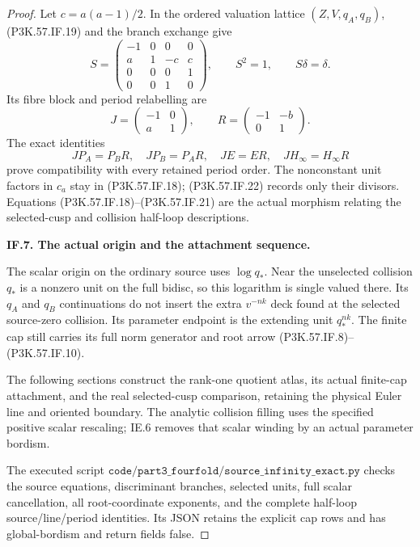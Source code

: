 \begin{proof}
Let \(c=a(a-1)/2\). In the ordered valuation lattice
\((Z,V,q_A,q_B)\), (P3K.57.IF.19) and the branch exchange give
\[
 S=\begin{pmatrix}
 -1&0&0&0\\ a&1&-c&c\\0&0&0&1\\0&0&1&0
 \end{pmatrix},\qquad S^2=1,\qquad S\delta=\delta.       \tag{P3K.57.IF.22}
\]
Its fibre block and period relabelling are
\[
 J=\begin{pmatrix}-1&0\\a&1\end{pmatrix},\qquad
 R=\begin{pmatrix}-1&-b\\0&1\end{pmatrix}.
\]
The exact identities
\[
 JP_A=P_BR,\quad JP_B=P_AR,\quad JE=ER,\quad
 JH_\infty=H_\infty R                                  \tag{P3K.57.IF.23}
\]
prove compatibility with every retained period order. The nonconstant
unit factors in \(c_a\) stay in (P3K.57.IF.18); (P3K.57.IF.22) records only their divisors.
Equations (P3K.57.IF.18)--\allowbreak (P3K.57.IF.21) are the actual morphism relating the
selected-cusp and collision half-loop descriptions.

\par\medskip\noindent\textbf{IF.7. The actual origin and the attachment sequence.}\par\nopagebreak[4]

The scalar origin on the ordinary source uses \(\log q_*\). Near the
unselected collision \(q_*\) is a nonzero unit on the full bidisc, so this
logarithm is single valued there. Its \(q_A\) and \(q_B\) continuations do
not insert the extra \(v^{-nk}\) deck found at the selected source-zero
collision. Its parameter endpoint is the extending unit \(q_*^{nk}\).
The finite cap still carries its full norm generator and root arrow
(P3K.57.IF.8)--\allowbreak (P3K.57.IF.10).

The following sections construct the rank-one quotient atlas, its actual finite-cap
attachment, and the real selected-cusp comparison, retaining the physical Euler line
and oriented boundary. The analytic collision filling uses the specified positive
scalar rescaling; IE.6 removes that scalar winding by an actual parameter bordism.

The executed script
\(\texttt{code/part3\_fourfold/source\_infinity\_exact.py}\) checks the
source equations, discriminant branches, selected units, full scalar
cancellation, all root-coordinate exponents, and the complete half-loop
source/line/period identities. Its JSON retains the explicit cap rows
and has global-bordism and return fields false.


\end{proof}
